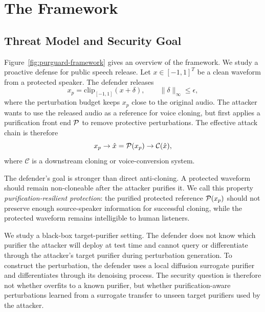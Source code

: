 \section{The \method{} Framework}

\subsection{Threat Model and Security Goal}

Figure~\ref{fig:purguard-framework} gives an overview of the \method{} framework. We study a proactive defense for public speech release. 
Let $x \in [-1,1]^T$ be a clean waveform from a protected speaker. The defender releases
\begin{equation}
    x_p = \mathrm{clip}_{[-1,1]}(x + \delta), \qquad \|\delta\|_{\infty} \leq \epsilon,
\end{equation}
where the perturbation budget keeps $x_p$ close to the original audio. The attacker wants to use the released audio as a reference for voice cloning, 
but first applies a purification front end $\mathcal{P}$ to remove protective perturbations. The effective attack chain is therefore
\begin{equation}
    x_p \rightarrow \hat{x}=\mathcal{P}(x_p) \rightarrow \mathcal{C}(\hat{x}),
\end{equation}
where $\mathcal{C}$ is a downstream cloning or voice-conversion system.

The defender's goal is stronger than direct anti-cloning. A protected waveform should remain non-cloneable after the attacker purifies it. 
We call this property \emph{purification-resilient protection}: the purified protected reference $\mathcal{P}(x_p)$ should not preserve enough source-speaker information for successful cloning, 
while the protected waveform remains intelligible to human listeners.

We study a black-box target-purifier setting. The defender does not know which purifier the attacker will deploy at test time and cannot query or differentiate through the attacker's target purifier during perturbation generation. 
To construct the perturbation, the defender uses a local diffusion surrogate purifier and differentiates through its denoising process. 
The security question is therefore not whether \method{} overfits to a known purifier, but whether purification-aware perturbations learned from a surrogate transfer to unseen target purifiers used by the attacker.


